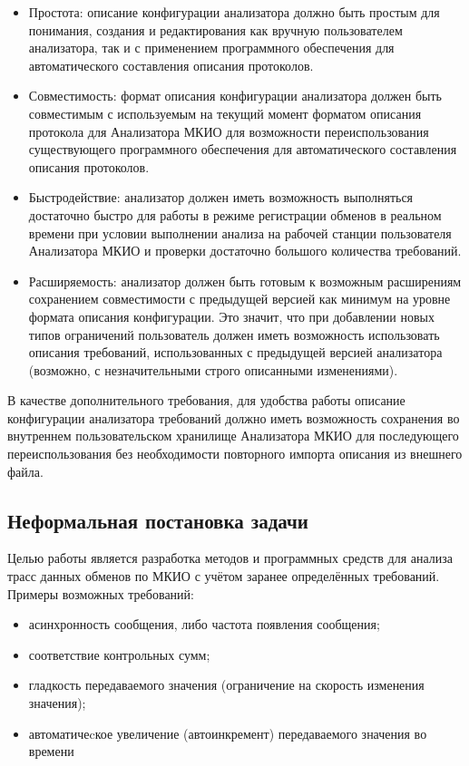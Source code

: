 \begin{itemize}
 \item Простота: описание конфигурации анализатора должно быть простым для 
понимания, создания и редактирования как вручную пользователем анализатора, так 
и с применением программного обеспечения для автоматического составления 
описания протоколов.
 \item Совместимость: формат описания конфигурации анализатора должен быть 
совместимым с 
используемым на текущий момент форматом описания протокола для Анализатора 
МКИО для возможности переиспользования существующего программного обеспечения 
для автоматического составления описания протоколов.
 \item Быстродействие: анализатор должен иметь возможность выполняться 
достаточно быстро для работы в режиме регистрации обменов в реальном времени при 
условии выполнении анализа на рабочей станции пользователя Анализатора МКИО и 
проверки достаточно большого количества требований.
 \item Расширяемость: анализатор должен быть готовым к возможным расширениям 
сохранением совместимости с предыдущей версией как минимум на уровне формата 
описания конфигурации. Это значит, что при добавлении новых типов ограничений 
пользователь должен иметь возможность использовать описания требований, 
использованных с предыдущей версией анализатора (возможно, с незначительными 
строго описанными изменениями).
\end{itemize}

В качестве дополнительного требования, для удобства работы описание 
конфигурации анализатора требований должно иметь возможность сохранения во 
внутреннем пользовательском хранилище Анализатора МКИО для последующего 
переиспользования без необходимости повторного импорта описания из внешнего 
файла.

\iffalse
\subsection{Неформальная постановка задачи}

Целью работы является разработка методов и программных средств для 
анализа трасс данных обменов по МКИО с учётом заранее определённых требований. 
Примеры возможных требований:

\begin{itemize}
 \item асинхронность сообщения, либо частота появления сообщения;
 \item соответствие контрольных сумм;
 \item гладкость передаваемого значения (ограничение на скорость изменения 
значения);
 \item автоматичеcкое увеличение (автоинкремент) передаваемого значения во 
времени
\end{itemize}

